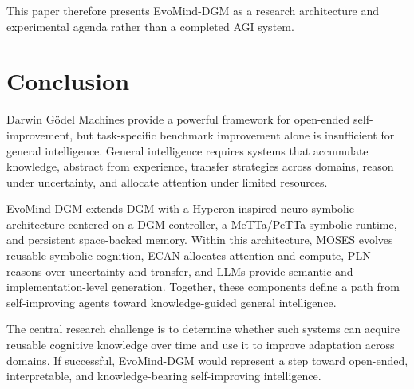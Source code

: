 \documentclass[11pt]{article}
\begin{document}
This paper therefore presents EvoMind-DGM as a research architecture and experimental agenda rather than a completed AGI system.

\section{Conclusion}

Darwin G\"odel Machines provide a powerful framework for open-ended self-improvement, but task-specific benchmark improvement alone is insufficient for general intelligence. General intelligence requires systems that accumulate knowledge, abstract from experience, transfer strategies across domains, reason under uncertainty, and allocate attention under limited resources.

EvoMind-DGM extends DGM with a Hyperon-inspired neuro-symbolic architecture centered on a DGM controller, a MeTTa/PeTTa symbolic runtime, and persistent space-backed memory. Within this architecture, MOSES evolves reusable symbolic cognition, ECAN allocates attention and compute, PLN reasons over uncertainty and transfer, and LLMs provide semantic and implementation-level generation. Together, these components define a path from self-improving agents toward knowledge-guided general intelligence.

The central research challenge is to determine whether such systems can acquire reusable cognitive knowledge over time and use it to improve adaptation across domains. If successful, EvoMind-DGM would represent a step toward open-ended, interpretable, and knowledge-bearing self-improving intelligence.



\end{document}

